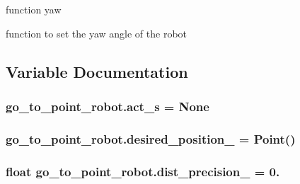 function yaw 

function to set the yaw angle of the robot 

\subsection{Variable Documentation}
\subsubsection[{\texorpdfstring{act\+\_\+s}{act_s}}]{\setlength{\rightskip}{0pt plus 5cm}go\+\_\+to\+\_\+point\+\_\+robot.\+act\+\_\+s = None}\hypertarget{namespacego__to__point__robot_ab19ed2eba072e150275e059ca41a4cfc}{}\label{namespacego__to__point__robot_ab19ed2eba072e150275e059ca41a4cfc}
\subsubsection[{\texorpdfstring{desired\+\_\+position\+\_\+}{desired_position_}}]{\setlength{\rightskip}{0pt plus 5cm}go\+\_\+to\+\_\+point\+\_\+robot.\+desired\+\_\+position\+\_\+ = Point()}\hypertarget{namespacego__to__point__robot_ab42eca5c5072ff7b4d95c8e13827dba7}{}\label{namespacego__to__point__robot_ab42eca5c5072ff7b4d95c8e13827dba7}
\subsubsection[{\texorpdfstring{dist\+\_\+precision\+\_\+}{dist_precision_}}]{\setlength{\rightskip}{0pt plus 5cm}float go\+\_\+to\+\_\+point\+\_\+robot.\+dist\+\_\+precision\+\_\+ = 0.}\hypertarget{namespacego__to__point__robot_adce474cb3bcc2782904a1e6129217a4c}{}\label{namespacego__to__point__robot_adce474cb3bcc2782904a1e6129217a4c}
